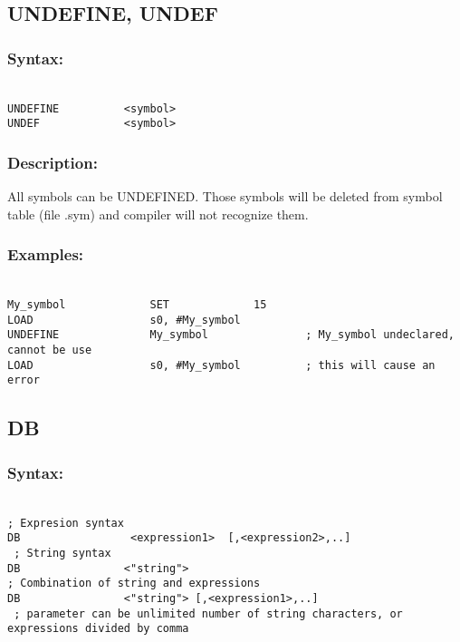     \subsection{UNDEFINE, UNDEF}

        \subsubsection{Syntax:}
        {
            ~\\
            \usecodefont
        \verb'UNDEFINE          <symbol>'\\
        \verb'UNDEF             <symbol>'
        }
        \subsubsection{Description:}
        All symbols can be UNDEFINED. Those symbols will be deleted from symbol table (file .sym) and compiler will not recognize them.

        \subsubsection{Examples:}
        {
            ~\\
            \usecodefont
            \verb'My_symbol             SET             15'\\
            \verb'LOAD                  s0, #My_symbol'\\
            \verb'UNDEFINE              My_symbol               ; My_symbol undeclared, cannot be use'\\
            \verb'LOAD                  s0, #My_symbol          ; this will cause an error'\\
        }

    \subsection{DB}
        \subsubsection{Syntax:}
        {
            ~\\
            \usecodefont
            \verb '; Expresion syntax'\\
            \verb'DB                 <expression1>  [,<expression2>,..]'\\
            \verb' ; String syntax'\\
            \verb'DB                <"string">'\\
            \verb'; Combination of string and expressions'\\
            \verb'DB                <"string"> [,<expression1>,..]'\\
            \verb' ; parameter can be unlimited number of string characters, or expressions divided by comma'\\
        }
